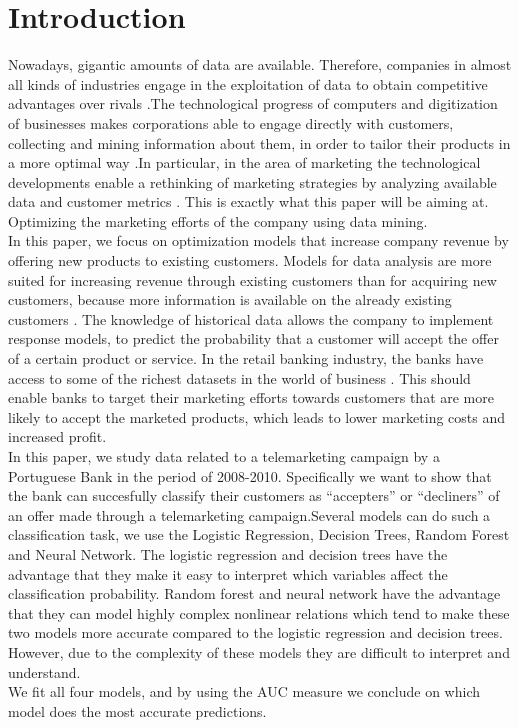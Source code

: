     \section{Introduction}
\noindent Nowadays, gigantic amounts of data are available. Therefore, companies in almost all kinds of industries engage in the exploitation of data to obtain competitive advantages over rivals \citep{provost2013data}.The technological progress of computers and digitization of businesses makes corporations able to engage directly with customers, collecting and mining information about them, in order to tailor their products in a more optimal way \citep{rust2010rethinking}.In particular, in the area of marketing the technological developments enable a rethinking of marketing strategies by analyzing available data and customer metrics \citep{moro2014data}. This is exactly what this paper will be aiming at. Optimizing the marketing efforts of the company using data mining.\\
[\baselineskip]\indent In this paper, we focus on optimization models that increase company revenue by offering new products to existing customers. Models for data analysis are more suited for increasing revenue through existing customers than for acquiring new customers, because more information is available on the already existing customers \citep{nobibon2011optimization}. The knowledge of historical data allows the company to implement response models, to predict the probability that a customer will accept the offer of a certain product or service. In the retail banking industry, the banks have access to some of the richest datasets in the world of business \citep{nobibon2011optimization}. This should enable banks to target their marketing efforts towards customers that are more likely to accept the marketed products, which leads to lower marketing costs and increased profit.\\
[\baselineskip]\indent In this paper, we study data related to a telemarketing campaign by a Portuguese Bank in the period of 2008-2010. Specifically we want to show that the bank can succesfully classify their customers as “accepters” or “decliners” of an offer made through a telemarketing campaign.Several models can do such a classification task, we use the Logistic Regression, Decision Trees, Random Forest and Neural Network. The logistic regression and decision trees have the advantage that they make it easy to interpret which variables affect the classification probability. Random forest and neural network have the advantage that they can model highly complex nonlinear relations which tend to make these two models more accurate compared to the logistic regression and decision trees. However, due to the complexity of these models they are difficult to interpret and understand.\\
We fit all four models, and by using the AUC measure we conclude on which model does the most accurate predictions.
    \newpage
    \pagestyle{fancy}
